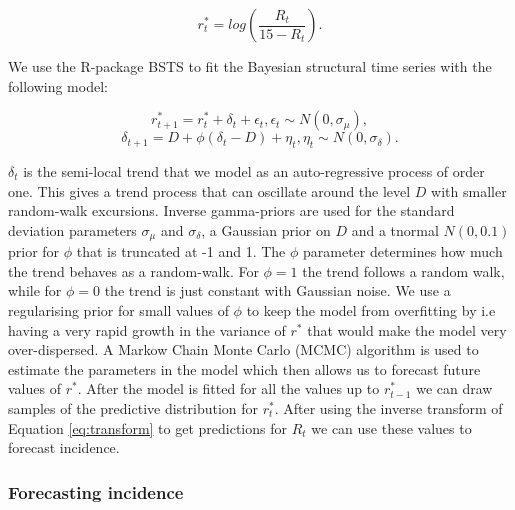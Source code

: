 \documentclass[12pt]{article}
\begin{document}
\begin{equation}
r^*_t = log\left(\frac{R_t}{15 - R_t}\right).
\label{eq:transform}
\end{equation}

We use the R-package BSTS \cite{scottBstsBayesianStructural2019} to fit the Bayesian structural time series with the following model:

\[r^*_{t+1} = r^*_t + \delta_t + \epsilon_t, \epsilon_t \sim N(0, \sigma_\mu),\]
\[\delta_{t+1} = D + \phi(\delta_t - D) + \eta_t, \eta_t \sim N(0, \sigma_\delta).\]

$\delta_t$ is the semi-local trend that we model as an auto-regressive process of order one. This gives a trend process that can oscillate around the level $D$ with smaller random-walk excursions. Inverse gamma-priors are used for the standard deviation parameters $\sigma_\mu$ and $\sigma_\delta$, a Gaussian prior on $D$ and a tnormal $N(0, 0.1)$ prior for $\phi$ that is truncated at -1 and 1. The $\phi$ parameter determines how much the trend behaves as a random-walk. For $\phi=1$ the trend follows a random walk, while for $\phi=0$ the trend is just constant with Gaussian noise. We use a regularising prior for small values of $\phi$ to keep the model from overfitting by i.e having a very rapid growth in the variance of $r^*$ that would make the model very over-dispersed. A Markow Chain Monte Carlo (MCMC) algorithm is used to estimate the parameters in the model which then allows us to forecast future values of $r^*$. After the model is fitted for all the values up to  $r^*_{t-1}$ we can draw samples of the predictive distribution for $r^*_t$. After using the inverse transform of Equation \ref{eq:transform} to get predictions for $R_t$ we can use these values to forecast incidence. 


\subsubsection{Forecasting incidence}
\end{document}
